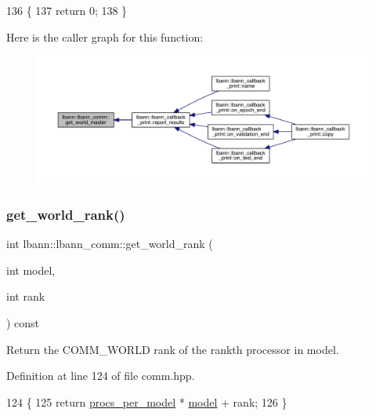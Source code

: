 \begin{DoxyCode}
136                                       \{
137     \textcolor{keywordflow}{return} 0;
138   \}
\end{DoxyCode}
Here is the caller graph for this function\+:\nopagebreak
\begin{figure}[H]
\begin{center}
\leavevmode
\includegraphics[width=350pt]{classlbann_1_1lbann__comm_aa682313f366e0b7cf781bc1872911f65_icgraph}
\end{center}
\end{figure}
\mbox{\label{classlbann_1_1lbann__comm_ab3b1ebe8b72575094405eb2e37bb447d}} 
\subsubsection{\texorpdfstring{get\+\_\+world\+\_\+rank()}{get\_world\_rank()}}
{\footnotesize\ttfamily int lbann\+::lbann\+\_\+comm\+::get\+\_\+world\+\_\+rank (\begin{DoxyParamCaption}\item[{int}]{model,  }\item[{int}]{rank }\end{DoxyParamCaption}) const\hspace{0.3cm}{\ttfamily [inline]}}

Return the C\+O\+M\+M\+\_\+\+W\+O\+R\+LD rank of the rank\textquotesingle{}th processor in model. 

Definition at line 124 of file comm.\+hpp.


\begin{DoxyCode}
124                                                        \{
125     \textcolor{keywordflow}{return} \hyperlink{classlbann_1_1lbann__comm_a7cb55d127259d7ed9f07ccde6f4ebd8c}{procs\_per\_model} * \hyperlink{namespacelbann_adee41f31f15f3906cbdcce4a1417eb56a20f35e630daf44dbfa4c3f68f5399d8c}{model} + rank;
126   \}
\end{DoxyCode}
\mbox{\label{classlbann_1_1lbann__comm_ae12af95f4826571efa03fb8520260daa}} 
